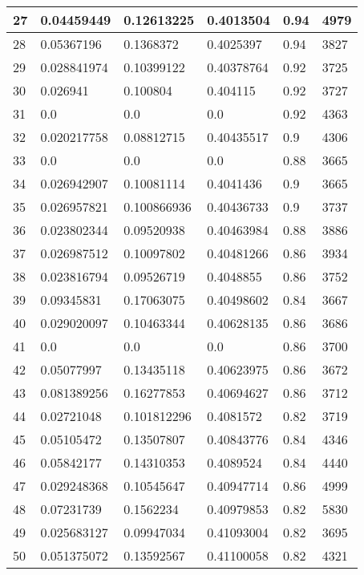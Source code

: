 \begin{longtable}{|l|l|l|l|l|l|}
27 & 0.04459449 & 0.12613225 & 0.4013504 & 0.94 & 4979 \\ \hline 
28 & 0.05367196 & 0.1368372 & 0.4025397 & 0.94 & 3827 \\ \hline 
29 & 0.028841974 & 0.10399122 & 0.40378764 & 0.92 & 3725 \\ \hline 
30 & 0.026941 & 0.100804 & 0.404115 & 0.92 & 3727 \\ \hline 
31 & 0.0 & 0.0 & 0.0 & 0.92 & 4363 \\ \hline 
32 & 0.020217758 & 0.08812715 & 0.40435517 & 0.9 & 4306 \\ \hline 
33 & 0.0 & 0.0 & 0.0 & 0.88 & 3665 \\ \hline 
34 & 0.026942907 & 0.10081114 & 0.4041436 & 0.9 & 3665 \\ \hline 
35 & 0.026957821 & 0.100866936 & 0.40436733 & 0.9 & 3737 \\ \hline 
36 & 0.023802344 & 0.09520938 & 0.40463984 & 0.88 & 3886 \\ \hline 
37 & 0.026987512 & 0.10097802 & 0.40481266 & 0.86 & 3934 \\ \hline 
38 & 0.023816794 & 0.09526719 & 0.4048855 & 0.86 & 3752 \\ \hline 
39 & 0.09345831 & 0.17063075 & 0.40498602 & 0.84 & 3667 \\ \hline 
40 & 0.029020097 & 0.10463344 & 0.40628135 & 0.86 & 3686 \\ \hline 
41 & 0.0 & 0.0 & 0.0 & 0.86 & 3700 \\ \hline 
42 & 0.05077997 & 0.13435118 & 0.40623975 & 0.86 & 3672 \\ \hline 
43 & 0.081389256 & 0.16277853 & 0.40694627 & 0.86 & 3712 \\ \hline 
44 & 0.02721048 & 0.101812296 & 0.4081572 & 0.82 & 3719 \\ \hline 
45 & 0.05105472 & 0.13507807 & 0.40843776 & 0.84 & 4346 \\ \hline 
46 & 0.05842177 & 0.14310353 & 0.4089524 & 0.84 & 4440 \\ \hline 
47 & 0.029248368 & 0.10545647 & 0.40947714 & 0.86 & 4999 \\ \hline 
48 & 0.07231739 & 0.1562234 & 0.40979853 & 0.82 & 5830 \\ \hline 
49 & 0.025683127 & 0.09947034 & 0.41093004 & 0.82 & 3695 \\ \hline 
50 & 0.051375072 & 0.13592567 & 0.41100058 & 0.82 & 4321 \\ \hline 
\end{longtable}